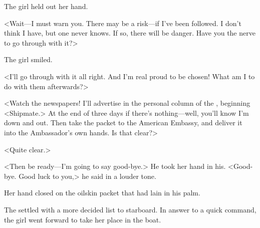 The girl held out her hand.

<Wait—I must warn you. There may be a risk—if I've been followed. I don't think I have, but one never knows. If so, there will be danger. Have you the nerve to go through with it?>

The girl smiled.

<I'll go through with it all right. And I'm real proud to be chosen! What am I to do with them afterwards?>

<Watch the newspapers! I'll advertise in the personal column of the , beginning <Shipmate.> At the end of three days if there's nothing—well, you'll know I'm down and out. Then take the packet to the American Embassy, and deliver it into the Ambassador's own hands. Is that clear?>

<Quite clear.>

<Then be ready—I'm going to say good-bye.> He took her hand in his. <Good-bye. Good luck to you,> he said in a louder tone.

Her hand closed on the oilskin packet that had lain in his palm.

The  settled with a more decided list to starboard. In answer to a quick command, the girl went forward to take her place in the boat. 